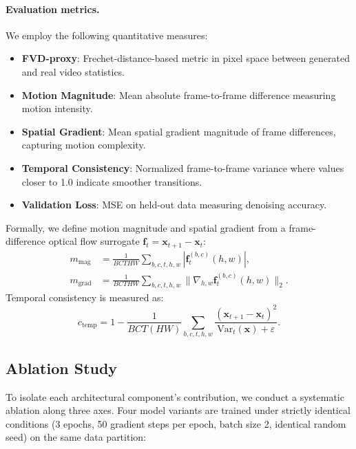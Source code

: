 \documentclass{ieeeaccess}
\begin{document}
\paragraph{Evaluation metrics.} We employ the following quantitative measures:
\begin{itemize}
    \item \textbf{FVD-proxy}: Frechet-distance-based metric in pixel space between generated and real video statistics.
    \item \textbf{Motion Magnitude}: Mean absolute frame-to-frame difference measuring motion intensity.
    \item \textbf{Spatial Gradient}: Mean spatial gradient magnitude of frame differences, capturing motion complexity.
    \item \textbf{Temporal Consistency}: Normalized frame-to-frame variance where values closer to 1.0 indicate smoother transitions.
    \item \textbf{Validation Loss}: MSE on held-out data measuring denoising accuracy.
\end{itemize}

Formally, we define motion magnitude and spatial gradient from a frame-difference optical flow surrogate $\mathbf{f}_t = \mathbf{x}_{t+1} - \mathbf{x}_t$:
\begin{align}
    m_\mathrm{mag} &= \frac{1}{BCTHW}\sum_{b,c,t,h,w} |\mathbf{f}^{(b,c)}_t(h,w)|, \\
    m_\mathrm{grad} &= \frac{1}{BCTHW}\sum_{b,c,t,h,w} \|\nabla_{h,w} \mathbf{f}^{(b,c)}_t(h,w)\|_2.
\end{align}
Temporal consistency is measured as:
\begin{equation}
    c_\mathrm{temp} = 1 - \frac{1}{BCT(HW)}\sum_{b,c,t,h,w} \frac{(\mathbf{x}_{t+1}-\mathbf{x}_t)^2}{\mathrm{Var}_t(\mathbf{x}) + \varepsilon}.
\end{equation}

\subsection{Ablation Study}
\label{sec:ablation}

To isolate each architectural component's contribution, we conduct a systematic ablation along three axes. Four model variants are trained under strictly identical conditions (3 epochs, 50 gradient steps per epoch, batch size 2, identical random seed) on the same data partition:
\end{document}
